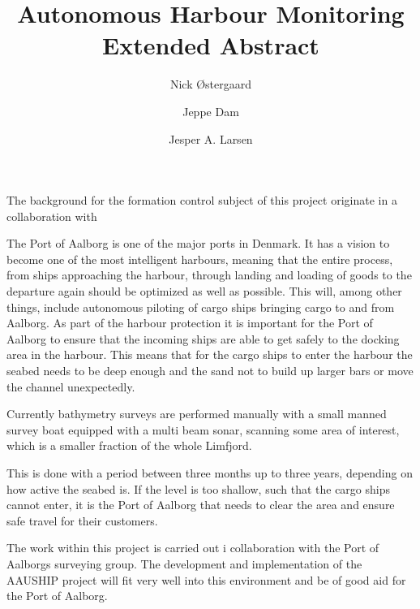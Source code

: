 \documentclass[a4paper,12pt]{article}
\begin{document}
\title{\vspace{-2cm}Autonomous Harbour Monitoring\\
\vspace{0.3cm}\small{Extended Abstract}}
\author{Nick Østergaard \and Jeppe Dam \and Jesper A. Larsen}
\maketitle


The background for the formation control subject of this project
originate in a collaboration with 

The Port of Aalborg is one of the major ports in Denmark. It has a vision to become one of the most
intelligent harbours, meaning that the entire process, from ships approaching the harbour, through landing and loading of goods to the departure again should be optimized as well as possible. This will, among other
things, include autonomous piloting of cargo ships bringing cargo to
and from Aalborg. As part of the harbour protection it is important
for the Port of Aalborg to ensure that the incoming ships are able to
get safely to the docking area in the harbour. This means that for the
cargo ships to enter the harbour the seabed needs to be deep enough
and the sand not to build up larger bars or move the channel
unexpectedly.

Currently bathymetry surveys are performed manually with a small
manned survey boat equipped with a multi beam sonar, scanning some
area of interest, which is a smaller fraction of the whole Limfjord.

This is done with a period between three months up to three years,
depending on how active the seabed is. If the level is too shallow,
such that the cargo ships cannot enter, it is the Port of Aalborg that
needs to clear the area and ensure safe travel for their customers.

The work within this project is carried out i collaboration with the Port of
Aalborgs surveying group. The development and implementation of
the AAUSHIP project will fit very well into this environment and be of
good aid for the Port of Aalborg.
\end{document}

